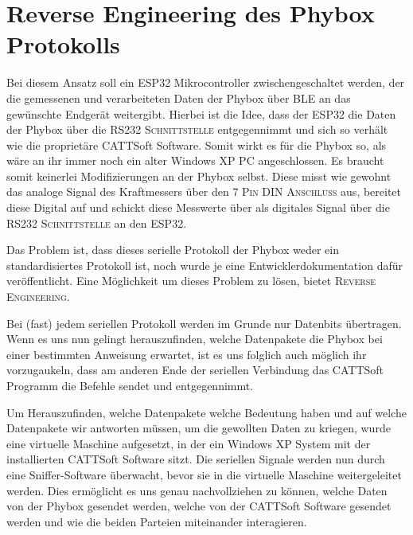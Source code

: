 \section{Reverse Engineering des Phybox Protokolls}
\label{sec:Reverse Engineering des Phybox Protokolls}

\begin{figure}[htb]
    \centering
\end{figure}

Bei diesem Ansatz soll ein \ac{ESP32} Mikrocontroller zwischengeschaltet werden, der die gemessenen und verarbeiteten Daten der Phybox über \ac{BLE} an das gewünschte Endgerät weitergibt. Hierbei ist die Idee, dass der ESP32 die Daten der Phybox über die \textsc{RS232 Schnittstelle} entgegennimmt und sich so verhält wie die proprietäre CATTSoft Software. Somit wirkt es für die Phybox so, als wäre an ihr immer noch ein alter Windows XP \ac{PC} angeschlossen. Es braucht somit keinerlei Modifizierungen an der Phybox selbst. Diese misst wie gewohnt das analoge Signal des Kraftmessers über den \textsc{7 Pin DIN Anschluss} aus, bereitet diese Digital auf und schickt diese Messwerte über als digitales Signal über die \textsc{RS232 Schnittstelle} an den \ac{ESP32}.

Das Problem ist, dass dieses serielle Protokoll der Phybox weder ein standardisiertes Protokoll ist, noch wurde je eine Entwicklerdokumentation dafür veröffentlicht. Eine Möglichkeit um dieses Problem zu lösen, bietet \textsc{Reverse Engineering}.

Bei (fast) jedem seriellen Protokoll werden im Grunde nur Datenbits übertragen. Wenn es uns nun gelingt herauszufinden, welche Datenpakete die Phybox bei einer bestimmten Anweisung erwartet, ist es uns folglich auch möglich ihr vorzugaukeln, dass am anderen Ende der seriellen Verbindung das CATTSoft Programm die Befehle sendet und entgegennimmt.

Um Herauszufinden, welche Datenpakete welche Bedeutung haben und auf welche Datenpakete wir antworten müssen, um die gewollten Daten zu kriegen, wurde eine virtuelle Maschine aufgesetzt, in der ein Windows XP System mit der installierten CATTSoft Software sitzt. Die seriellen Signale werden nun durch eine Sniffer-Software überwacht, bevor sie in die virtuelle Maschine weitergeleitet werden. Dies ermöglicht es uns genau nachvollziehen zu können, welche Daten von der Phybox gesendet werden, welche von der CATTSoft Software gesendet werden und wie die beiden Parteien miteinander interagieren.


